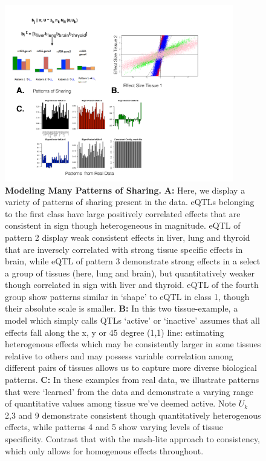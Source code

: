 
\newline
\begin{figure}[htbp]
\includegraphics[width=10cm]{Figures/Patterns.pdf}%
\caption{\textbf{Modeling Many Patterns of Sharing.} \textbf{A:} Here, we display a variety of patterns of sharing present in the data. eQTLs belonging to the first class have large positively correlated effects that are consistent in sign though heterogeneous in magnitude. eQTL of pattern 2 display weak consistent effects in liver, lung and thyroid that are inversely correlated with strong tissue specific effects in brain, while eQTL of pattern 3 demonstrate strong effects in a select a group of tissues (here, lung and brain), but quantitatively weaker though correlated in sign with liver and thyroid. eQTL of the fourth group show patterns similar in `shape' to eQTL in class 1, though their absolute scale is smaller. \textbf{B:} In this two tissue-example, a model which simply calls QTLs `active' or `inactive' assumes that all effects fall along the x, y or 45 degree (1,1) line: estimating heterogenous effects which may be consistently larger in some tissues relative to others and may possess variable correlation among different pairs of tissues allows us to capture more diverse biological patterns. \textbf{C:} In these examples from real data, we illustrate patterns that were `learned' from the data and demonstrate a varying range of quantitative values among tissue we've deemed active. Note $U_{k}$ 2,3 and 9 demonstrate consistent though quantitatively heterogenous effects, while patterns 4 and 5 show varying levels of tissue specificity. Contrast that with the mash-lite approach to consistency, which only allows for homogenous effects throughout.}
\label{fig:Patterns}
\end{figure}
\newline


